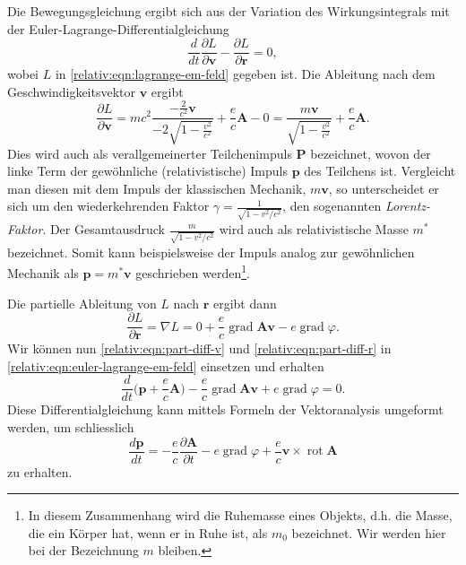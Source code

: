 Die Bewegungsgleichung ergibt sich aus der Variation des Wirkungsintegrals
mit der Euler-Lagrange-Differentialgleichung
\begin{equation}
    \frac{d}{dt} \frac{\partial L}{\partial \bm{v}} - \frac{\partial L}{\partial \bm{r}} = 0,
    \label{relativ:eqn:euler-lagrange-em-feld}
\end{equation}
wobei \(L\) in \eqref{relativ:eqn:lagrange-em-feld} gegeben ist.
Die Ableitung nach dem Geschwindigkeitsvektor \(\bm{v}\) ergibt
\begin{equation}
    \frac{\partial L}{\partial \bm{v}} =
    mc^2 \frac{-\frac{2}{c^2}\bm{v}}{-2\sqrt{1-\frac{v^2}{c^2}}}
    + \frac{e}{c} \bm{A} - 0
    = \frac{m \bm{v}}{\sqrt{1-\frac{v^2}{c^2}}} + \frac{e}{c} \bm{A}.
    \label{relativ:eqn:part-diff-v}
\end{equation}
Dies wird auch als verallgemeinerter Teilchenimpuls \(\bm{P}\) bezeichnet,
wovon der linke Term der gewöhnliche (relativistische) Impuls \(\bm{p}\)
des Teilchens ist.
Vergleicht man diesen mit dem Impuls der klassischen Mechanik, \(m\bm{v}\),
so unterscheidet er sich um den wiederkehrenden Faktor
\(\gamma=\frac{1}{\sqrt{1-v^2/c^2}}\), den sogenannten \emph{Lorentz-Faktor}.
Der Gesamtausdruck \(\frac{m}{\sqrt{1-v^2/c^2}}\) wird auch als
relativistische Masse \(m^*\) bezeichnet. Somit kann beispielsweise der
Impuls analog zur gewöhnlichen Mechanik als
\(\bm{p}=m^*\bm{v}\) geschrieben werden\footnote{
    In diesem Zusammenhang wird die Ruhemasse eines Objekts, d.h.
    die Masse, die ein Körper hat, wenn er in Ruhe ist,
    als \(m_0\) bezeichnet.
    Wir werden hier bei der Bezeichnung \(m\) bleiben.
}.

Die partielle Ableitung von \(L\) nach \(\bm{r}\) ergibt dann
\begin{equation}
    \frac{\partial L}{\partial \bm{r}} = \nabla L
    = 0 + \frac{e}{c} \operatorname{grad} \bm{Av} - e \operatorname{grad} \varphi.
    \label{relativ:eqn:part-diff-r}
\end{equation}
Wir können nun \eqref{relativ:eqn:part-diff-v} und \eqref{relativ:eqn:part-diff-r}
in \eqref{relativ:eqn:euler-lagrange-em-feld} einsetzen und erhalten
\begin{equation}
    \frac{d}{dt} \biggl(\bm{p} + \frac{e}{c} \bm{A}\biggr)
    - \frac{e}{c} \operatorname{grad} \bm{Av} + e \operatorname{grad} \varphi = 0.
    \label{relativ:eqn:euler-lagrange-em-eingesetzt}
\end{equation}
Diese Differentialgleichung kann mittels Formeln der Vektoranalysis
umgeformt werden, um schliesslich
\begin{equation}
    \frac{d\bm{p}}{dt} = -\frac{e}{c} \frac{\partial\bm{A}}{\partial t}
    - e \operatorname{grad} \varphi +
    \frac{e}{c} \bm{v} \times \operatorname{rot} \bm{A}
    \label{relativ:eqn:euler-lagrange-em-umgeformt}
\end{equation}
zu erhalten.

